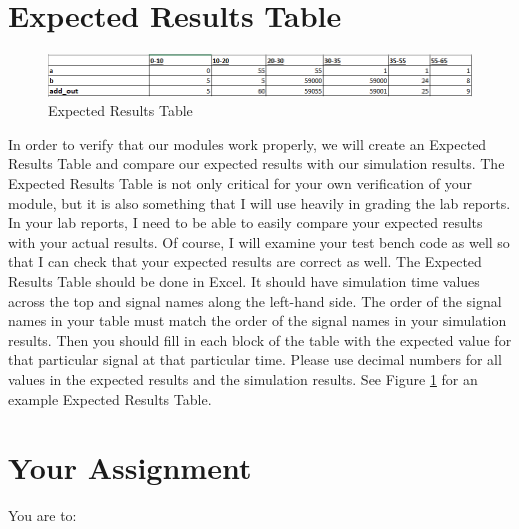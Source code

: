 \section{Expected Results Table}
\begin{figure}
	\caption{Expected Results Table}\label{fig:ert_adder_test}
	\begin{center}
		\includegraphics[width=4.75in]{../images/ert_adder_test.png}
	\end{center}
\end{figure} 
In order to verify that our modules work properly, we will create an Expected Results Table and compare our expected results with our simulation results.  The Expected Results Table is not only critical for your own verification of your module, but it is also something that I will use heavily in grading the lab reports.  In your lab reports, I need to be able to easily compare your expected results with your actual results.  Of course, I will examine your test bench code as well so that I can check that your expected results are correct as well.  The Expected Results Table should be done in Excel.  It should have simulation time values across the top and signal names along the left-hand side.  The order of the signal names in your table must match the order of the signal names in your simulation results.  Then you should fill in each block of the table with the expected value for that particular signal at that particular time.  Please use decimal numbers for all values in the expected results and the simulation results. See Figure \ref{fig:ert_adder_test} for an example Expected Results Table.

\section{Your Assignment}

You are to:
